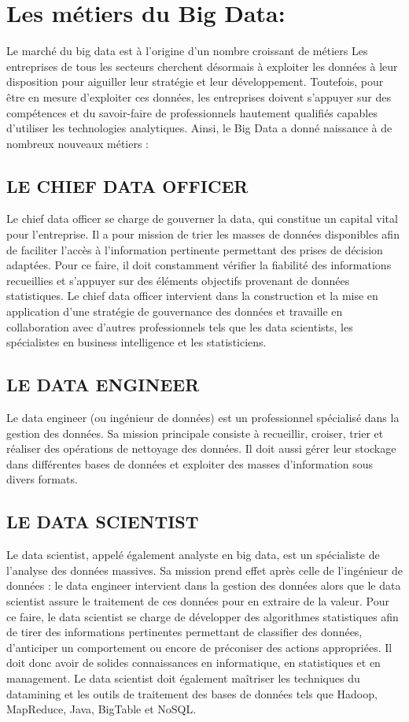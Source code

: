 \section{Les métiers du Big Data:}
Le marché du big data est à l’origine d’un nombre croissant de métiers Les entreprises de tous les secteurs cherchent désormais à exploiter les données à leur disposition pour aiguiller leur stratégie et leur développement. Toutefois, pour être en mesure d'exploiter ces données, les entreprises doivent s'appuyer sur des compétences et du savoir-faire de professionnels hautement qualifiés capables d'utiliser les technologies analytiques. Ainsi, le Big Data a donné naissance à de nombreux nouveaux métiers : 

\subsection{LE CHIEF DATA OFFICER}
Le chief data officer se charge de gouverner la data, qui constitue un capital vital pour l’entreprise. Il a pour mission de trier les masses de données disponibles afin de faciliter l’accès à l’information pertinente permettant des prises de décision adaptées. Pour ce faire, il doit constamment vérifier la fiabilité des informations recueillies et s’appuyer sur des éléments objectifs provenant de données statistiques. Le chief data officer intervient dans la construction et la mise en application d’une stratégie de gouvernance des données et travaille en collaboration avec d’autres professionnels tels que les data scientists, les spécialistes en business intelligence et les statisticiens.

\subsection{LE DATA ENGINEER}
Le data engineer (ou ingénieur de données) est un professionnel spécialisé dans la gestion des données. Sa mission principale consiste à recueillir, croiser, trier et réaliser des opérations de nettoyage des données. Il doit aussi gérer leur stockage dans différentes bases de données et exploiter des masses d’information sous divers formats.

\subsection{LE DATA SCIENTIST}
Le data scientist, appelé également analyste en big data, est un spécialiste de l’analyse des données massives. Sa mission prend effet après celle de l’ingénieur de données : le data engineer intervient dans la gestion des données alors que le data scientist assure le traitement de ces données pour en extraire de la valeur. Pour ce faire, le data scientist se charge de développer des algorithmes statistiques afin de tirer des informations pertinentes permettant de classifier des données, d’anticiper un comportement ou encore de préconiser des actions appropriées. Il doit donc avoir de solides connaissances en informatique, en statistiques et en management. Le data scientist doit également maîtriser les techniques du datamining et les outils de traitement des bases de données tels que Hadoop, MapReduce, Java, BigTable et NoSQL.

